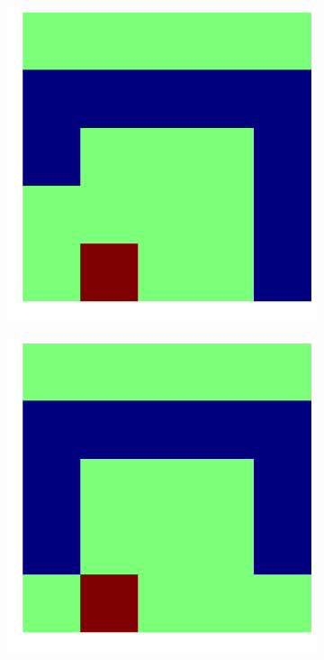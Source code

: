 \documentclass{article}
\begin{document}
\begin{figure}[!htpb]
\begin{subfigure}[b]{.19\linewidth}
  \end{subfigure}
  \begin{subfigure}[b]{.19\linewidth}
    \includegraphics[width=\linewidth]{snake_72.png}
  \end{subfigure}
  \begin{subfigure}[b]{.19\linewidth}
    \includegraphics[width=\linewidth]{snake_73.png}

\end{subfigure}
\end{figure}
\end{document}
